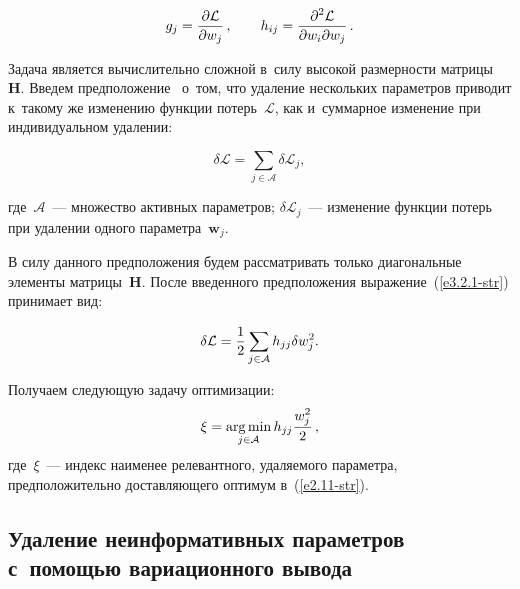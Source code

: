 \begin{multicols}{2}
\noindent
\begin{equation*}
g_j = \displaystyle\frac{\displaystyle \partial \mathcal{L}\mathstrut}{\displaystyle \partial w_j\mathstrut}\,, \qquad h_{ij} = 
\displaystyle\frac{\displaystyle \partial^2\mathcal{L}\mathstrut}{\displaystyle \partial w_i \partial w_j\mathstrut}\,. 
\end{equation*}

Задача является вычислительно слож\-ной в~силу высокой раз\-мер\-ности мат\-ри\-цы 
\textbf{H}. Введем предположение~\cite{cun1990} о~том, что удаление нескольких 
па\-ра\-мет\-ров приводит к~такому же изменению функции потерь~$\mathcal{L}$, как 
и~суммарное изменение при индивидуальном удалении:

\vspace*{2pt}

\noindent
\begin{equation*}
\delta \mathcal{L} = \sum\limits_{j\in \mathcal{A}} \delta \mathcal{L}_j, 
\end{equation*}

\vspace*{-2pt}

\noindent
где~$\mathcal{A}$~--- множество активных параметров; $\delta\mathcal{L}_j$~--- 
изменение функции потерь при удалении одного па\-ра\-мет\-ра~$\mathbf{w}_j$.

В силу данного предположения будем рас\-смат\-ри\-вать только диагональные элементы 
мат\-ри\-цы~\textbf{H}. После введенного предположения 
выражение~(\ref{e3.2.1-str}) принимает 
вид:

\vspace*{-1pt}

\noindent
\begin{equation*}
\delta \mathcal{L} = \displaystyle\frac{\displaystyle 1\mathstrut}{\displaystyle 2\mathstrut} \sum\limits_{j\in \mathcal{A}} h_{jj}\delta w_j^2. 
\end{equation*}

\vspace*{-2pt}

Получаем следующую задачу оптимизации:
\begin{equation*}
\xi = \mathop{\mathrm{arg}\,\mathrm{min}}\limits_{j\in \mathcal{A}} h_{jj}\displaystyle\frac{\displaystyle w_j^2\mathstrut}{\displaystyle 2\mathstrut}\,, 
\end{equation*}
где~$\xi$~--- индекс наименее релевантного, уда\-ля\-емо\-го па\-ра\-мет\-ра, 
предположительно до\-став\-ля\-юще\-го оптимум в~(\ref{e2.11-str}).

\vspace*{-4pt}

\subsection{Удаление неинформативных параметров с~помощью вариационного вывода}


\end{multicols}

